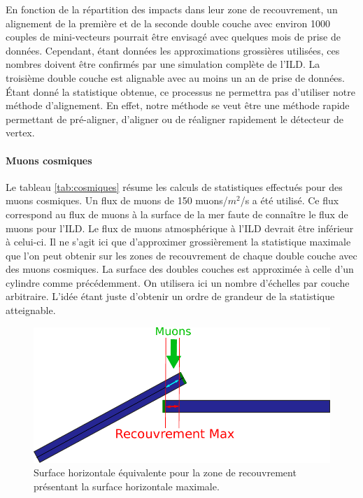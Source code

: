  \medskip
 
 En fonction de la r\'epartition des impacts dans leur zone de recouvrement, un alignement de la premi\`ere et de la seconde double couche avec environ 1000 couples de mini-vecteurs pourrait \^etre envisag\'e avec quelques mois de prise de donn\'ees. Cependant, \'etant donn\'ees les approximations grossi\`eres utilis\'ees, ces nombres doivent \^etre confirm\'es par une simulation compl\`ete de l'ILD. La troisi\`eme double couche est alignable avec au moins un an de prise de donn\'ees. \'Etant donn\'e la statistique obtenue, ce processus ne permettra pas d'utiliser notre m\'ethode d'alignement. En effet, notre m\'ethode se veut \^etre une m\'ethode rapide permettant de pr\'e-aligner, d'aligner ou de r\'ealigner rapidement le d\'etecteur de vertex.

 \FloatBarrier
 
\paragraph{Muons cosmiques}
  
 Le tableau \ref{tab:cosmiques} r\'esume les calculs de statistiques effectu\'es pour des muons cosmiques. Un flux de muons de 150 muons/$m^2$/s a \'et\'e utilis\'e. Ce flux correspond au flux de muons \`a la surface de la mer faute de conna\^itre le flux de muons pour l'ILD. Le flux de muons atmosph\'erique \`a l'ILD devrait \^etre inf\'erieur \`a celui-ci. Il ne s'agit ici que d'approximer grossi\`erement la statistique maximale que l'on peut obtenir sur les zones de recouvrement de chaque double couche avec des muons cosmiques. La surface des doubles couches est approxim\'ee \`a celle d'un cylindre comme pr\'ec\'edemment. On utilisera ici un nombre d'\'echelles par couche arbitraire. L'id\'ee \'etant juste d'obtenir un ordre de grandeur de la statistique atteignable.
 
   \begin{figure}[!htb]
    \begin{center}
      \includegraphics[scale=0.6]{./figures/muons_schema.pdf}
      \caption{Surface horizontale \'equivalente pour la zone de recouvrement pr\'esentant la surface horizontale maximale.}
      \label{fig:Muons_surface}
    \end{center}
  \end{figure}
 
